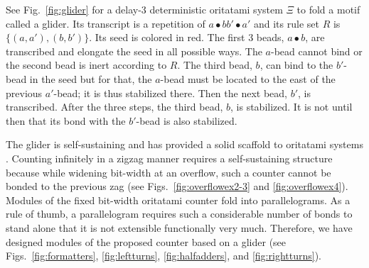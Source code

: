 \documentclass[twocolumn]{svjour3}
\begin{document}
\begin{example}
	See Fig.~\ref{fig:glider} for a delay-3 deterministic oritatami system $\Xi$ to fold a motif called a glider. 
	Its transcript is a repetition of $a \bullet b b' \bullet a'$ and its rule set $R$ is $\{(a, a'), (b, b')\}$. 
	Its seed is colored in red. 
	The first 3 beads, $a \bullet b$, are transcribed and elongate the seed in all possible ways. 
	The $a$-bead cannot bind or the second bead is inert according to $R$. 
	The third bead, $b$, can bind to the $b'$-bead in the seed but for that, the $a$-bead must be located to the east of the previous $a'$-bead; it is thus stabilized there. 
	Then the next bead, $b'$, is transcribed. 
	After the three steps, the third bead, $b$, is stabilized. 
	It is not until then that its bond with the $b'$-bead is also stabilized. 
	
	The glider is self-sustaining and has provided a solid scaffold to oritatami systems \cite{DemaineHOPRSST2018,ElonenBachelor2016,GeMeScSe2018,HanKim2018,PchelinaSSU2020}. 
	Counting infinitely in a zigzag manner requires a self-sustaining structure because while widening bit-width at an overflow, such a counter cannot be bonded to the previous zag (see Figs.~\ref{fig:overflowex2-3} and \ref{fig:overflowex4}).  
	Modules of the fixed bit-width oritatami counter fold into parallelograms. 
	As a rule of thumb, a parallelogram requires such a considerable number of bonds to stand alone that it is not extensible functionally very much. 
	Therefore, we have designed modules of the proposed counter based on a glider (see Figs.~\ref{fig:formatters}, \ref{fig:leftturns}, \ref{fig:halfadders}, and \ref{fig:rightturns}). 
\end{example}




\end{document}
